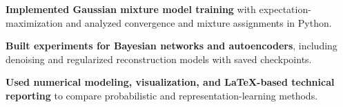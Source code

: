 \begin{bullets}
    \item \textbf{Implemented Gaussian mixture model training} with expectation-maximization and analyzed convergence and mixture assignments in Python.
    \item \textbf{Built experiments for Bayesian networks and autoencoders}, including denoising and regularized reconstruction models with saved checkpoints.
    \item \textbf{Used numerical modeling, visualization, and LaTeX-based technical reporting} to compare probabilistic and representation-learning methods.
\end{bullets}